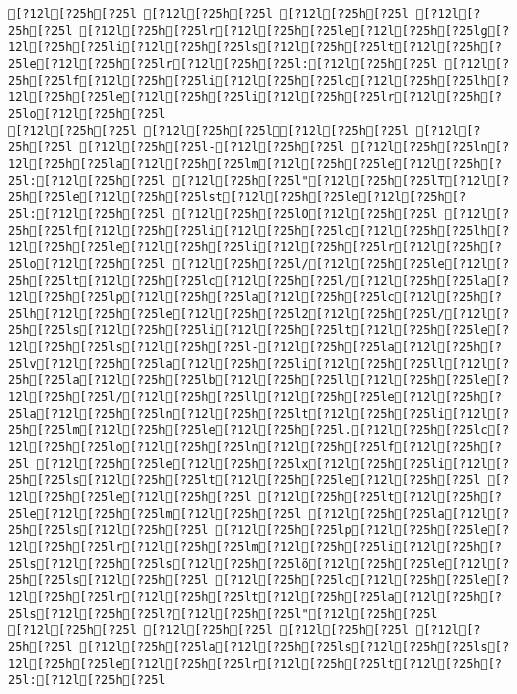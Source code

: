 \documentclass{scrartcl}
\begin{document}
\begin{Verbatim}
[?12l[?25h[?25l [?12l[?25h[?25l [?12l[?25h[?25l [?12l[?25h[?25l [?12l[?25h[?25lr[?12l[?25h[?25le[?12l[?25h[?25lg[?12l[?25h[?25li[?12l[?25h[?25ls[?12l[?25h[?25lt[?12l[?25h[?25le[?12l[?25h[?25lr[?12l[?25h[?25l:[?12l[?25h[?25l [?12l[?25h[?25lf[?12l[?25h[?25li[?12l[?25h[?25lc[?12l[?25h[?25lh[?12l[?25h[?25le[?12l[?25h[?25li[?12l[?25h[?25lr[?12l[?25h[?25lo[?12l[?25h[?25l
[?12l[?25h[?25l [?12l[?25h[?25l[?12l[?25h[?25l [?12l[?25h[?25l [?12l[?25h[?25l-[?12l[?25h[?25l [?12l[?25h[?25ln[?12l[?25h[?25la[?12l[?25h[?25lm[?12l[?25h[?25le[?12l[?25h[?25l:[?12l[?25h[?25l [?12l[?25h[?25l"[?12l[?25h[?25lT[?12l[?25h[?25le[?12l[?25h[?25lst[?12l[?25h[?25le[?12l[?25h[?25l:[?12l[?25h[?25l [?12l[?25h[?25lO[?12l[?25h[?25l [?12l[?25h[?25lf[?12l[?25h[?25li[?12l[?25h[?25lc[?12l[?25h[?25lh[?12l[?25h[?25le[?12l[?25h[?25li[?12l[?25h[?25lr[?12l[?25h[?25lo[?12l[?25h[?25l [?12l[?25h[?25l/[?12l[?25h[?25le[?12l[?25h[?25lt[?12l[?25h[?25lc[?12l[?25h[?25l/[?12l[?25h[?25la[?12l[?25h[?25lp[?12l[?25h[?25la[?12l[?25h[?25lc[?12l[?25h[?25lh[?12l[?25h[?25le[?12l[?25h[?25l2[?12l[?25h[?25l/[?12l[?25h[?25ls[?12l[?25h[?25li[?12l[?25h[?25lt[?12l[?25h[?25le[?12l[?25h[?25ls[?12l[?25h[?25l-[?12l[?25h[?25la[?12l[?25h[?25lv[?12l[?25h[?25la[?12l[?25h[?25li[?12l[?25h[?25ll[?12l[?25h[?25la[?12l[?25h[?25lb[?12l[?25h[?25ll[?12l[?25h[?25le[?12l[?25h[?25l/[?12l[?25h[?25ll[?12l[?25h[?25le[?12l[?25h[?25la[?12l[?25h[?25ln[?12l[?25h[?25lt[?12l[?25h[?25li[?12l[?25h[?25lm[?12l[?25h[?25le[?12l[?25h[?25l.[?12l[?25h[?25lc[?12l[?25h[?25lo[?12l[?25h[?25ln[?12l[?25h[?25lf[?12l[?25h[?25l [?12l[?25h[?25le[?12l[?25h[?25lx[?12l[?25h[?25li[?12l[?25h[?25ls[?12l[?25h[?25lt[?12l[?25h[?25le[?12l[?25h[?25l [?12l[?25h[?25le[?12l[?25h[?25l [?12l[?25h[?25lt[?12l[?25h[?25le[?12l[?25h[?25lm[?12l[?25h[?25l [?12l[?25h[?25la[?12l[?25h[?25ls[?12l[?25h[?25l [?12l[?25h[?25lp[?12l[?25h[?25le[?12l[?25h[?25lr[?12l[?25h[?25lm[?12l[?25h[?25li[?12l[?25h[?25ls[?12l[?25h[?25ls[?12l[?25h[?25lõ[?12l[?25h[?25le[?12l[?25h[?25ls[?12l[?25h[?25l [?12l[?25h[?25lc[?12l[?25h[?25le[?12l[?25h[?25lr[?12l[?25h[?25lt[?12l[?25h[?25la[?12l[?25h[?25ls[?12l[?25h[?25l?[?12l[?25h[?25l"[?12l[?25h[?25l
[?12l[?25h[?25l [?12l[?25h[?25l [?12l[?25h[?25l [?12l[?25h[?25l [?12l[?25h[?25la[?12l[?25h[?25ls[?12l[?25h[?25ls[?12l[?25h[?25le[?12l[?25h[?25lr[?12l[?25h[?25lt[?12l[?25h[?25l:[?12l[?25h[?25l

\end{Verbatim}
\end{document}
